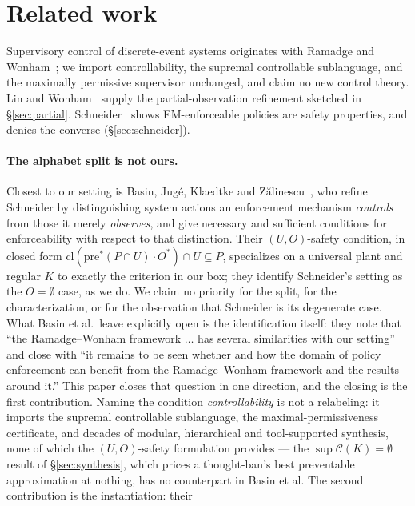 \documentclass[11pt,a4paper]{article}  \usepackage{mdframed} \usepackage{graphicx} \usepackage{tabularx}
\begin{document}


\section{Related work}\label{sec:related} Supervisory control of discrete-event systems originates with Ramadge and
Wonham~\cite{rw87,rw89}; we import controllability, the supremal controllable sublanguage, and the maximally permissive
supervisor unchanged, and claim no new control theory. Lin and Wonham~\cite{lw88} supply the partial-observation refinement
sketched in \S\ref{sec:partial}. Schneider~\cite{schneider} shows EM-enforceable policies are safety properties, and denies
the converse (\S\ref{sec:schneider}).

\paragraph{The alphabet split is not ours.} Closest to our setting is Basin, Jug\'e, Klaedtke and
Z\u{a}linescu~\cite{bjkz13}, who refine Schneider by distinguishing system actions an enforcement mechanism \emph{controls}
from those it merely \emph{observes}, and give necessary and sufficient conditions for enforceability with respect to that
distinction. Their $(U,O)$-safety condition, in closed form $\mathrm{cl}(\mathrm{pre}^*(P\cap U)\cdot O^*)\cap U\subseteq P$,
specializes on a universal plant and regular $K$ to exactly the criterion in our box; they identify Schneider's setting as
the $O=\emptyset$ case, as we do. We claim no priority for the split, for the characterization, or for the observation that
Schneider is its degenerate case. What Basin et al.\ leave explicitly open is the identification itself: they note that ``the
Ramadge--Wonham framework $\ldots$ has several similarities with our setting'' and close with ``it remains to be seen whether
and how the domain of policy enforcement can benefit from the Ramadge--Wonham framework and the results around it.'' This
paper closes that question in one direction, and the closing is the first contribution. Naming the condition
\emph{controllability} is not a relabeling: it imports the supremal controllable sublanguage, the maximal-permissiveness
certificate, and decades of modular, hierarchical and tool-supported synthesis, none of which the $(U,O)$-safety formulation
provides --- the $\sup\mathcal{C}(K)=\emptyset$ result of \S\ref{sec:synthesis}, which prices a thought-ban's best
preventable approximation at nothing, has no counterpart in Basin et al. The second contribution is the instantiation: their
\end{document}

